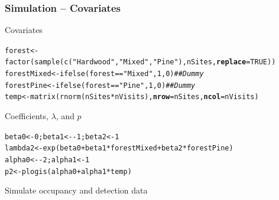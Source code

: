 \documentclass[color=usenames,dvipsnames]{beamer}\usepackage[]{graphicx}\usepackage[]{xcolor}
\makeatletter
\newcommand{\hlnum}[1]{\textcolor[rgb]{0.69,0.494,0}{#1}}%
\newcommand{\hlsng}[1]{\textcolor[rgb]{0.749,0.012,0.012}{#1}}%
\newcommand{\hlcom}[1]{\textcolor[rgb]{0.514,0.506,0.514}{\textit{#1}}}%
\newcommand{\hlopt}[1]{\textcolor[rgb]{0,0,0}{#1}}%
\newcommand{\hldef}[1]{\textcolor[rgb]{0,0,0}{#1}}%
\newcommand{\hlkwb}[1]{\textcolor[rgb]{0,0.341,0.682}{#1}}%
\newcommand{\hlkwc}[1]{\textcolor[rgb]{0,0,0}{\textbf{#1}}}%
\newcommand{\hlkwd}[1]{\textcolor[rgb]{0.004,0.004,0.506}{#1}}%
\newenvironment{kframe}{%
 \def\at@end@of@kframe{}%
 \ifinner\ifhmode%
  \def\at@end@of@kframe{\end{minipage}}%
  \begin{minipage}{\columnwidth}%
 \fi\fi%
 \def\FrameCommand##1{\hskip\@totalleftmargin \hskip-\fboxsep
 \colorbox{shadecolor}{##1}\hskip-\fboxsep
     \hskip-\linewidth \hskip-\@totalleftmargin \hskip\columnwidth}%
 \MakeFramed {\advance\hsize-\width
   \@totalleftmargin\z@ \linewidth\hsize
   \@setminipage}}%
 {\par\unskip\endMakeFramed%
 \at@end@of@kframe}
\newenvironment{knitrout}{}{} %
\makeatother
\begin{document}
\begin{frame}[fragile]
  \frametitle{Simulation -- Covariates}
  \small
  Covariates
  \vspace{-6pt}
\begin{knitrout}\scriptsize
{}\color{fgcolor}\begin{kframe}
\begin{alltt}
\hldef{forest} \hlkwb{<-} \hlkwd{factor}\hldef{(}\hlkwd{sample}\hldef{(}\hlkwd{c}\hldef{(}\hlsng{"Hardwood"}\hldef{,} \hlsng{"Mixed"}\hldef{,} \hlsng{"Pine"}\hldef{), nSites,} \hlkwc{replace}\hldef{=}\hlnum{TRUE}\hldef{))}
\hldef{forestMixed} \hlkwb{<-} \hlkwd{ifelse}\hldef{(forest}\hlopt{==}\hlsng{"Mixed"}\hldef{,} \hlnum{1}\hldef{,} \hlnum{0}\hldef{)}        \hlcom{## Dummy}
\hldef{forestPine} \hlkwb{<-} \hlkwd{ifelse}\hldef{(forest}\hlopt{==}\hlsng{"Pine"}\hldef{,} \hlnum{1}\hldef{,} \hlnum{0}\hldef{)}          \hlcom{## Dummy}
\hldef{temp} \hlkwb{<-} \hlkwd{matrix}\hldef{(}\hlkwd{rnorm}\hldef{(nSites}\hlopt{*}\hldef{nVisits),} \hlkwc{nrow}\hldef{=nSites,} \hlkwc{ncol}\hldef{=nVisits)}
\end{alltt}
\end{kframe}
\end{knitrout}
\vfill
  Coefficients, $\lambda$, and $p$
  \vspace{-6pt}
\begin{knitrout}\scriptsize
{}\color{fgcolor}\begin{kframe}
\begin{alltt}
\hldef{beta0} \hlkwb{<-} \hlnum{0}\hldef{; beta1} \hlkwb{<-} \hlopt{-}\hlnum{1}\hldef{; beta2} \hlkwb{<-} \hlnum{1}
\hldef{lambda2} \hlkwb{<-} \hlkwd{exp}\hldef{(beta0} \hlopt{+} \hldef{beta1}\hlopt{*}\hldef{forestMixed} \hlopt{+} \hldef{beta2}\hlopt{*}\hldef{forestPine)}
\hldef{alpha0} \hlkwb{<-} \hlopt{-}\hlnum{2}\hldef{; alpha1} \hlkwb{<-} \hlnum{1}
\hldef{p2} \hlkwb{<-} \hlkwd{plogis}\hldef{(alpha0} \hlopt{+} \hldef{alpha1}\hlopt{*}\hldef{temp)}
\end{alltt}
\end{kframe}
\end{knitrout}
\vfill
  Simulate occupancy and detection data
  \vspace{-6pt}

\end{frame}
\end{document}
